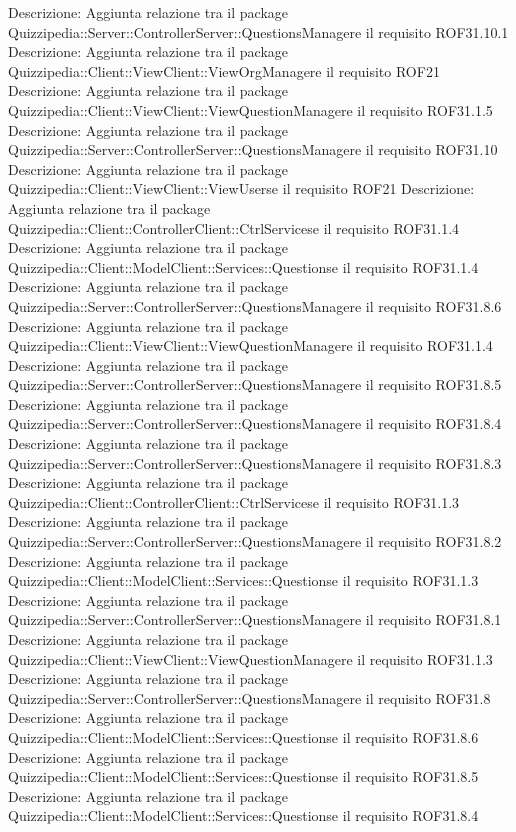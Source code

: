 Descrizione: Aggiunta relazione tra il package Quizzipedia::Server::ControllerServer::QuestionsManagere il requisito ROF31.10.1 
Descrizione: Aggiunta relazione tra il package Quizzipedia::Client::ViewClient::ViewOrgManagere il requisito ROF21 
Descrizione: Aggiunta relazione tra il package Quizzipedia::Client::ViewClient::ViewQuestionManagere il requisito ROF31.1.5 
Descrizione: Aggiunta relazione tra il package Quizzipedia::Server::ControllerServer::QuestionsManagere il requisito ROF31.10 
Descrizione: Aggiunta relazione tra il package Quizzipedia::Client::ViewClient::ViewUserse il requisito ROF21 
Descrizione: Aggiunta relazione tra il package Quizzipedia::Client::ControllerClient::CtrlServicese il requisito ROF31.1.4 
Descrizione: Aggiunta relazione tra il package Quizzipedia::Client::ModelClient::Services::Questionse il requisito ROF31.1.4 
Descrizione: Aggiunta relazione tra il package Quizzipedia::Server::ControllerServer::QuestionsManagere il requisito ROF31.8.6 
Descrizione: Aggiunta relazione tra il package Quizzipedia::Client::ViewClient::ViewQuestionManagere il requisito ROF31.1.4 
Descrizione: Aggiunta relazione tra il package Quizzipedia::Server::ControllerServer::QuestionsManagere il requisito ROF31.8.5 
Descrizione: Aggiunta relazione tra il package Quizzipedia::Server::ControllerServer::QuestionsManagere il requisito ROF31.8.4 
Descrizione: Aggiunta relazione tra il package Quizzipedia::Server::ControllerServer::QuestionsManagere il requisito ROF31.8.3 
Descrizione: Aggiunta relazione tra il package Quizzipedia::Client::ControllerClient::CtrlServicese il requisito ROF31.1.3 
Descrizione: Aggiunta relazione tra il package Quizzipedia::Server::ControllerServer::QuestionsManagere il requisito ROF31.8.2 
Descrizione: Aggiunta relazione tra il package Quizzipedia::Client::ModelClient::Services::Questionse il requisito ROF31.1.3 
Descrizione: Aggiunta relazione tra il package Quizzipedia::Server::ControllerServer::QuestionsManagere il requisito ROF31.8.1 
Descrizione: Aggiunta relazione tra il package Quizzipedia::Client::ViewClient::ViewQuestionManagere il requisito ROF31.1.3 
Descrizione: Aggiunta relazione tra il package Quizzipedia::Server::ControllerServer::QuestionsManagere il requisito ROF31.8 
Descrizione: Aggiunta relazione tra il package Quizzipedia::Client::ModelClient::Services::Questionse il requisito ROF31.8.6 
Descrizione: Aggiunta relazione tra il package Quizzipedia::Client::ModelClient::Services::Questionse il requisito ROF31.8.5 
Descrizione: Aggiunta relazione tra il package Quizzipedia::Client::ModelClient::Services::Questionse il requisito ROF31.8.4 
